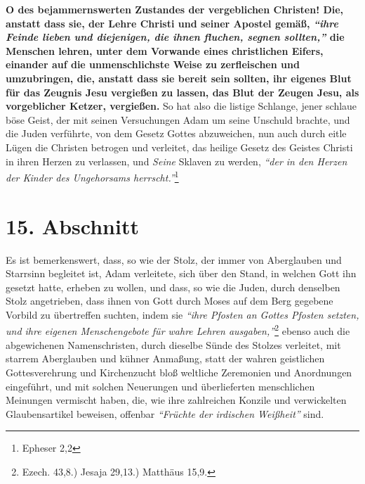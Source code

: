 \medskip

\label{ref:07_14_ketzer}
\textbf{O des bejammernswerten Zustandes der vergeblichen Christen! Die, anstatt
dass
sie, der Lehre Christi und seiner Apostel gemäß,
\textit{"`ihre Feinde lieben und
diejenigen, die ihnen fluchen, segnen sollten,"'}
die Menschen lehren, unter dem
Vorwande eines christlichen Eifers, einander auf die unmenschlichste Weise zu
zerfleischen und umzubringen, die, anstatt
dass sie bereit sein sollten, ihr
eigenes Blut für das Zeugnis Jesu vergießen zu lassen, das Blut der Zeugen Jesu,
als vorgeblicher Ketzer, vergießen.} So hat also die
listige Schlange, jener
schlaue böse Geist, der mit seinen Versuchungen Adam um
seine Unschuld
brachte, und die Juden verführte, von dem Gesetz
Gottes abzuweichen, nun
auch durch eitle Lügen die Christen betrogen und
verleitet, das heilige
Gesetz des Geistes Christi in ihren Herzen zu
verlassen, und \textit{Seine}
Sklaven zu werden,
\textit{"`der in den Herzen der Kinder des Ungehorsams
herrscht."'}\footnote{Epheser 2,2}

\section{15. Abschnitt} \label{kap7_ab15}

Es ist bemerkenswert, dass, so wie der Stolz, der immer von
Aberglauben und
Starrsinn begleitet ist, Adam verleitete,
sich über den Stand, in welchen
Gott ihn gesetzt hatte, erheben zu wollen, und dass, so wie die
Juden, durch
denselben Stolz angetrieben, dass ihnen von Gott durch
Moses auf dem Berg
gegebene Vorbild zu übertreffen suchten, indem sie
\textit{"`ihre Pfosten an Gottes
Pfosten setzten, und ihre eigenen Menschengebote für wahre Lehren
ausgaben,"'}\footnote{Ezech. 43,8.) Jesaja 29,13.) Matthäus 15,9.}
ebenso auch die
abgewichenen Namenschristen, durch dieselbe
Sünde
des Stolzes verleitet, mit
starrem Aberglauben und kühner Anmaßung, statt
der wahren geistlichen
Gottesverehrung und Kirchenzucht
bloß weltliche Zeremonien und Anordnungen
eingeführt, und mit solchen Neuerungen und überlieferten menschlichen Meinungen
vermischt haben, die, wie ihre zahlreichen Konzile  und
verwickelten
Glaubensartikel beweisen, offenbar
\textit{"`Früchte der irdischen Weißheit"'} sind.

